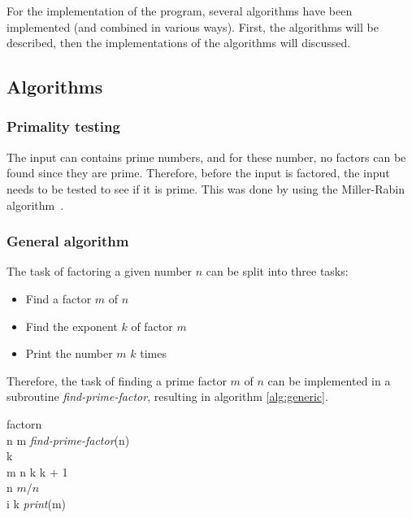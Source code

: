 For the implementation of the program, several algorithms have been implemented
(and combined in various ways). First, the algorithms will be described, then
the implementations of the algorithms will discussed.

\subsection{Algorithms}
\label{sec:algorithms}

\subsubsection{Primality testing}
The input can contains prime numbers, and for these number, no factors can be
found since they are prime. Therefore, before the input is factored, the input
needs to be tested to see if it is prime. 
This was done by using the Miller-Rabin
algorithm~\cite{wiki:miller-rabin}.

\subsubsection{General algorithm}
The task of factoring a given number $n$ can be split into three tasks:
\begin{itemize}
    \item Find a factor $m$ of $n$
    \item Find the exponent $k$ of factor $m$
    \item Print the number $m$ $k$ times
\end{itemize}
Therefore, the task of finding a prime factor $m$ of $n$ can be implemented in a
subroutine \emph{find-prime-factor}, resulting in algorithm \ref{alg:generic}.

\begin{pseudocode}{factor}{n}
\label{alg:generic}
 \\
    \WHILE n  \DO
        \BEGIN
            m \GETS \textit{find-prime-factor}(n) \\
            k  \\
            \WHILE m \mid n \DO
                \BEGIN
                    k \GETS k + 1 \\
                    n \GETS $m / n$
                \END \\
            \FOR i  \TO k \DO 
                \textit{print}(m)
        \END \\
\end{pseudocode}

